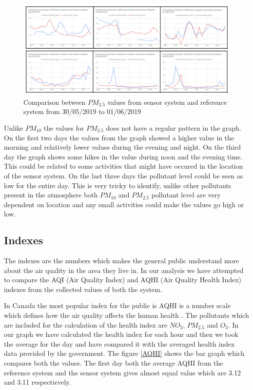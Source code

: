 \begin{figure}[h]
  \begin{center}
  \includegraphics[scale=0.70]{images/figure27.png}
  \end{center}
  \caption{Comparison between $PM_{2.5}$ values from sensor system and reference system from 30/05/2019 to 01/06/2019}
\label{PM2.5}
\end{figure}

Unlike $PM_{10}$  the values for $PM_{2.5}$ does not have a regular pattern in the graph. On the first two days the values from the graph showed a higher value in the morning and relatively lower values during the evening and night. On the third day the graph shows some hikes in the value during noon and the evening time. This could be related to some activities that might have occured in the location of the sensor system. On the last three days the pollutant level could be seen as low for the entire day. This is very tricky to identify, unlike other pollutants present in the atmosphere both $PM_{10}$  and $PM_{2.5}$ pollutant level are very dependent on location and any small activities could make the values go high or low.


\subsection{Indexes}

The indexes are the numbers which makes the general public understand more about the air quality in the area they live in. In our analysis we have attempted to compare the AQI (Air Quality Index) and AQHI (Air Quality Health Index) indexes from the collected values of both the system.

In Canada the most popular index for the public is AQHI is a number scale which defines how the air quality affects the human health \cite{AQHICAN}. The pollutants which are included for the calculation of the health index are $NO_{2}$, $PM_{2.5}$ and $O_{3}$. In our graph we have calculated the health index for each hour and then we took the average for the day and have compared it with the averaged health index data provided by the government. The figure \ref{AQHI} shows the bar graph which compares both the values. The first day both the average AQHI from the reference system and the sensor system gives almost equal value which are 3.12 and 3.11 respectievely.


